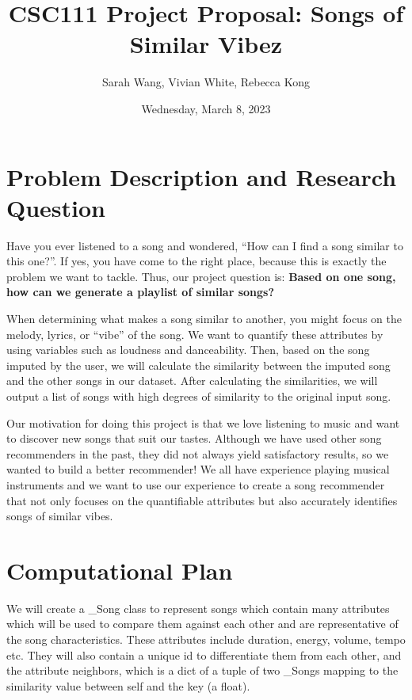 \documentclass[fontsize=11pt]{article}
\title{CSC111 Project Proposal: Songs of Similar Vibez}
\author{Sarah Wang, Vivian White, Rebecca Kong}
\date{Wednesday, March 8, 2023}
\begin{document}
\maketitle

\section*{Problem Description and Research Question}

Have you ever listened to a song and wondered, “How can I find a song similar to this one?”. If yes, you have come to the right place, because this is exactly the problem we want to tackle. Thus, our project question is: \textbf{Based on one song, how can we generate a playlist of similar songs?} \newline

\noindent When determining what makes a song similar to another, you might focus on the melody, lyrics, or “vibe” of the song. We want to quantify these attributes by using variables such as loudness and danceability. Then, based on the song imputed by the user, we will calculate the similarity between the imputed song and the other songs in our dataset. After calculating the similarities, we will output a list of songs with high degrees of similarity to the original input song.\newline

\noindent Our motivation for doing this project is that we love listening to music and want to discover new songs that suit our tastes. Although we have used other song recommenders in the past, they did not always yield satisfactory results, so we wanted to build a better recommender! We all have experience playing musical instruments and we want to use our experience to create a song recommender that not only focuses on the quantifiable attributes but also accurately identifies songs of similar vibes.


\section*{Computational Plan}
We will create a  \_Song class to represent songs which contain many attributes which will be used to compare them against each other and are representative of the song characteristics. These attributes include duration, energy, volume, tempo etc. They will also contain a unique id to differentiate them from each other, and the attribute neighbors,  which is a dict of a tuple of two \_Songs mapping to the similarity value between self and the key (a float). \newline
\end{document}
